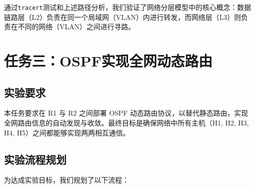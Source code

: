 \documentclass[12pt, a4paper]{article}
\begin{document}
通过\texttt{tracert}测试和上述路径分析，我们验证了网络分层模型中的核心概念：数据链路层（L2）负责在同一个局域网（VLAN）内进行转发，而网络层（L3）则负责在不同的网络（VLAN）之间进行寻路。

\newpage
\section{任务三：OSPF实现全网动态路由}

\subsection{实验要求}

本任务要求在 R1 与 R2 之间部署 OSPF 动态路由协议，以替代静态路由，实现全网路由信息的自动发现与收敛。最终目标是确保网络中所有主机（H1, H2, H3, H4, H5）之间都能够实现两两相互通信。

\subsection{实验流程规划}

为达成实验目标，我们规划了以下流程：
\end{document}
